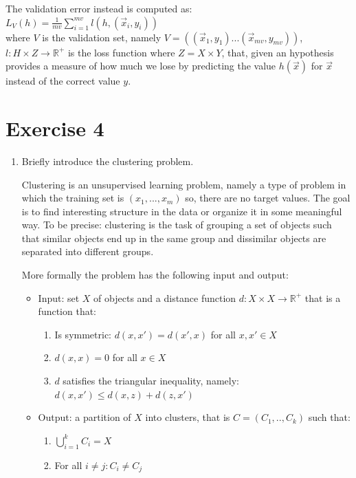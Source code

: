 \documentclass[a4paper,11pt,oneside]{book}
\begin{document}
\begin{enumerate}
\begin{solution}
    The validation error instead is computed as: \\ $L_V(h) = \frac{1}{mv}\sum_{i=1}^{mv} l(h, (\vec{x}_i,y_i))$ \\ where $V$ is the validation set, namely $V = ((\vec{x}_1, y_1) ... (\vec{x}_{mv}, y_{mv}))$, $l: H \times Z \to \mathbb{R}^+$ is the loss function where $Z = X \times Y$, that, given an hypothesis provides a measure of how much we lose by predicting the value $h(\vec{x})$ for $\vec{x}$ instead of the correct value $y$.
\end{solution}
\end{enumerate}

\clearpage
\section{Exercise 4}
\begin{enumerate}
\item Briefly introduce the clustering problem.
\begin{solution}
    Clustering is an unsupervised learning problem, namely a type of problem in which the training set is $(x_1, ..., x_m)$ so, there are no target values. The goal is to find interesting structure in the data or organize it in some meaningful way. To be precise:
    clustering is the task of grouping a set of objects such that similar objects end up in the same group and dissimilar objects are separated into different groups.
    
    More formally the problem has the following input and output:
    
    \begin{itemize}
    \item Input: set $X$ of objects and a distance function $d : X\times X \to \mathbb{R}^+$ that is a function that:
       \begin{enumerate}
       \item Is symmetric: $d(x,x') = d(x',x)$ for all $x,x' \in X$
       \item $d(x,x) = 0$ for all $x \in X$
       \item $d$ satisfies the triangular inequality, namely: $d(x,x') \leq d(x,z) + d(z,x')$
       \end{enumerate}
    
    \item Output: a partition of $X$ into clusters, that is $C = (C_1,..,C_k)$ such that:
       \begin{enumerate}
       \item $\bigcup_{i=1}^k C_i = X$
       \item For all $i \neq j : C_i \neq C_j$
       \end{enumerate}
    \end{itemize}
    

\end{solution}
\end{enumerate}
\end{document}
